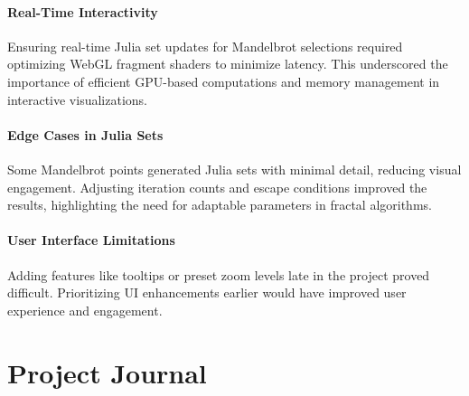 \documentclass[12pt,a4paper]{report}
\begin{document}
\paragraph{Real-Time Interactivity}
Ensuring real-time Julia set updates for Mandelbrot selections required optimizing WebGL fragment shaders to minimize latency. This underscored the importance of efficient GPU-based computations and memory management in interactive visualizations. 

\paragraph{Edge Cases in Julia Sets}
Some Mandelbrot points generated Julia sets with minimal detail, reducing visual engagement. Adjusting iteration counts and escape conditions improved the results, highlighting the need for adaptable parameters in fractal algorithms.

\paragraph{User Interface Limitations}
Adding features like tooltips or preset zoom levels late in the project proved difficult. Prioritizing UI enhancements earlier would have improved user experience and engagement. 

\section{Project Journal}
\newpage
\end{document}
